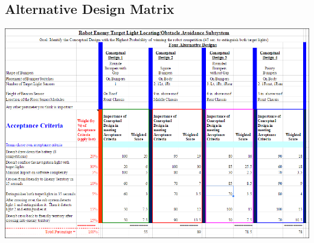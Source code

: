 \documentclass{article}
\begin{document}
\subsection{Alternative Design Matrix}
\includegraphics[width=\textwidth]{AlternativeDesigns.png}
\end{document}
